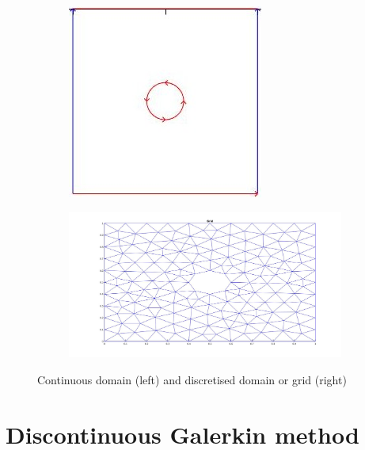 \documentclass[a4paper]{book}
\begin{document}
\begin{figure}[H]
\begin{subfigure}{.5\textwidth}
\centering
  \includegraphics[width=\linewidth]{domain.jpg}
  \label{fig:Domain}
\end{subfigure}
\begin{subfigure}{.5\textwidth}	
\centering
  \includegraphics[width=\linewidth]{grid.jpg}
  \label{fig:Mesh}
\end{subfigure}
\caption{Continuous domain (left) and discretised domain or grid (right)}
\label{fig:continuous_grid_figure}
\end{figure}

\section{Discontinuous Galerkin method}
\end{document}
